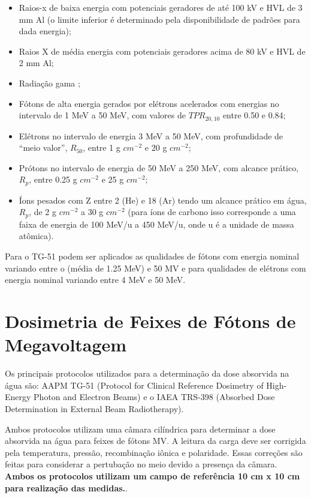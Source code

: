 \documentclass[11pt,a4paper]{article}
\begin{document}
		\begin{itemize}
			\item Raios-x de baixa energia com potenciais geradores de até 100 kV e HVL de 3 mm Al (o limite inferior é determinado pela disponibilidade de padrões para dada energia);
			\item Raios X de média energia com potenciais geradores acima de 80 kV e HVL de 2 mm Al;
			\item Radiação gama ;
			\item Fótons de alta energia gerados por elétrons acelerados com energias no intervalo de 1 MeV a 50 MeV, com valores de $TPR_{20,10}$ entre 0.50 e 0.84;
			\item Elétrons no intervalo de energia 3 MeV a 50 MeV, com profundidade de ``meio valor'', $R_{50}$, entre 1 g $cm^{-2}$ e 20 g $cm^{-2}$;
			\item Prótons no intervalo de energia de 50 MeV a 250 MeV, com alcance prático, $R_p$, entre 0.25 g $cm^{-2}$ e 25 g $cm^{-2}$;
			\item Íons pesados com Z entre 2 (He) e 18 (Ar) tendo um alcance prático em água, $R_p$, de 2 g $cm^{-2}$ a 30 g $cm^{-2}$ (para íons de carbono isso corresponde a uma faixa de energia de 100 MeV/u a 450 MeV/u, onde u é a unidade de massa atômica).
		\end{itemize}


		Para o TG-51 podem ser aplicados as qualidades de fótons com energia nominal variando entre o  (média de 1.25 MeV) e 50 MV e para qualidades de elétrons com energia nominal variando entre 4 MeV e 50 MeV. 


    \section{Dosimetria de Feixes de Fótons de Megavoltagem}

    Os principais protocolos utilizados para a determinação da dose absorvida na água são: AAPM TG-51 (Protocol for Clinical Reference Dosimetry of High-Energy Photon and Electron Beams) e  o IAEA TRS-398 (Absorbed Dose Determination in External Beam Radiotherapy).  

    Ambos protocolos utilizam uma câmara cilíndrica para determinar a dose absorvida na água para feixes de fótons MV.  A leitura da carga deve ser corrigida pela temperatura, pressão, recombinação iônica e polaridade. Essas correções são feitas para considerar a pertubação no meio devido a presença da câmara. \textbf{\textcolor{CarnationPink}{Ambos os protocolos utilizam um campo de referência 10 cm x 10 cm para realização das medidas.}}.
\end{document}
